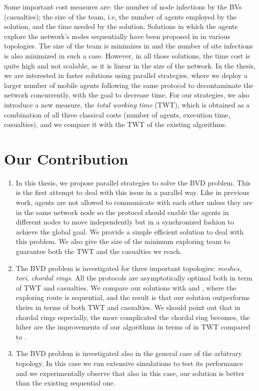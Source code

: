 Some important cost measures are: 
 the number of node infections by the BVs (casualties); 
the size of the team, i.e, the number of agents employed by the solution, and
the time needed by the solution. 
Solutions in which the agents explore the network's nodes sequentially have been proposed in \cite{alotaibi,cai,cai1} in various topologies. The size of the team is minimizes in \cite{cai,cai1} and the number of site infections is also minimized in such a case. However, in all those solutions, the time cost is quite high and not scalable, as it is linear in the size of the network.  In the thesis, we are interested in faster solutions using parallel strategies, where we deploy a larger number of mobile agents following the same protocol to decontaminate the network concurrently,  with the goal to  decrease time. For our strategies, we also introduce a new measure,   the {\em total working time} (TWT),  which is obtained as a combination of all three classical costs (number of agents,    execution time, casualties), and we compare it with the TWT of the existing algorithms.


\section{Our Contribution} 


\begin{enumerate}
\item In this thesis, we propose parallel strategies to solve the BVD problem. This is the first attempt to deal with this issue in a parallel way. Like in previous work, agents are not allowed to communicate with each other unless they are in the same network node so the protocol should enable the agents in different nodes to move independently but in  a synchronized fashion   to achieve the global goal.
We provide a simple   efficient solution to deal with this problem. 
We also give the size of the minimum exploring team  to guarantee both the TWT and the  casualties we reach.  \color{black}
\item The BVD problem is investigated for three important topologies: {\em meshes}, {\em tori}, {\em chordal rings}. All the protocols are asymptotically optimal both in term of TWT and casualties. We compare our solutions with \cite{alotaibi} and  \cite{cai}, where the exploring route is  sequential, and the result is that our solution outperforms theirs in terms of both TWT and casualties. We  should   point out that in chordal rings especially, the more complicated the chordal ring becomes, the hiher are the improvements of our algorithms in terms of in TWT  compared to \cite{alotaibi}.
\item The BVD problem is investigated also in the general case of the arbitrary topology. In this case we run extensive simulations to test its performance and we experimentally observe that also in this case, our solution is better than the existing sequential one.
\end{enumerate}

